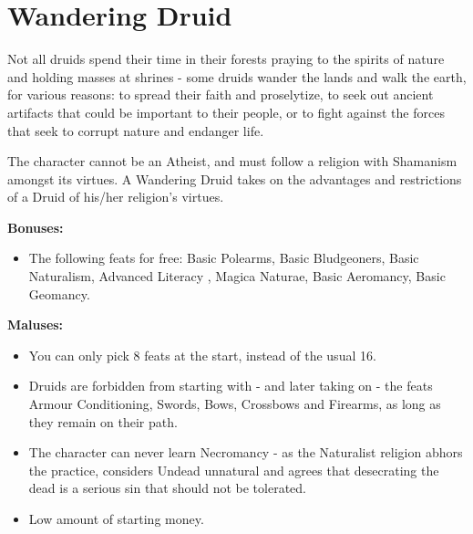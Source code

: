 \section{Wandering Druid}
Not all druids spend their time in their forests praying to the spirits of nature and holding masses at shrines - some druids wander the lands and walk the earth, for various reasons: to spread their faith and proselytize, to seek out ancient artifacts that could be important to their people, or to fight against the forces that seek to corrupt nature and endanger life.

The character cannot be an Atheist, and must follow a religion with Shamanism amongst its virtues. A Wandering Druid takes on the advantages and restrictions of a Druid of his/her religion's virtues.

\textbf{Bonuses:}
\begin{itemize}
	\item The following feats for free: Basic Polearms, Basic Bludgeoners, Basic Naturalism, Advanced Literacy , Magica Naturae, Basic Aeromancy, Basic Geomancy.
\end{itemize}


\textbf{Maluses:}
\begin{itemize}
	\item You can only pick 8 feats at the start, instead of the usual 16.
	\item Druids are forbidden from starting with - and later taking on - the feats Armour Conditioning, Swords, Bows, Crossbows and Firearms, as long as they remain on their path.
	\item The character can never learn Necromancy - as the Naturalist religion abhors the practice, considers Undead unnatural and agrees that desecrating the dead is a serious sin that should not be tolerated.
	\item Low amount of starting money.
\end{itemize}
